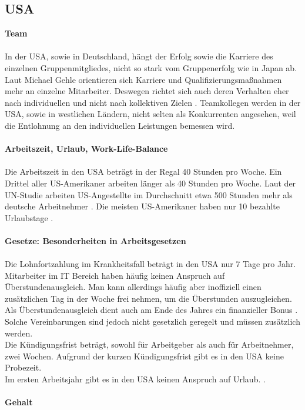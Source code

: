 	\subsection*{USA}
	\textbf{Team}\\
	\\
	In der USA, sowie in Deutschland, hängt der Erfolg sowie die Karriere des einzelnen Gruppenmitgliedes, nicht so stark vom Gruppenerfolg wie in Japan ab. Laut Michael Gehle orientieren sich Karriere und Qualifizierungsmaßnahmen mehr an einzelne Mitarbeiter. Deswegen richtet sich auch deren Verhalten eher nach individuellen und nicht nach kollektiven Zielen \cite[233]{3LaenderVergl}. 
	Teamkollegen werden in der USA, sowie in westlichen Ländern, nicht selten als Konkurrenten angesehen, weil die Entlohnung an den individuellen Leistungen bemessen wird. \\ \\
		\textbf{Arbeitszeit, Urlaub, Work-Life-Balance}\\
		\\
	Die Arbeitszeit in den USA beträgt in der Regal 40 Stunden pro Woche. 
	Ein Drittel aller US-Amerikaner arbeiten länger als 40 Stunden pro Woche.
	Laut der UN-Studie arbeiten US-Angestellte im Durchschnitt etwa 500 Stunden mehr als deutsche Arbeitnehmer \cite{ArbeitsumgUSA}. Die meisten US-Amerikaner haben nur 10 bezahlte Urlaubstage \cite{InfoUSArbVertr}.\\ \\
	\textbf{Gesetze: Besonderheiten in Arbeitsgesetzen}\\
		\\
		Die Lohnfortzahlung im Krankheitsfall beträgt in den USA nur 7 Tage pro Jahr. 
		Mitarbeiter im IT Bereich haben häufig keinen Anspruch auf Überstundenausgleich. Man kann allerdings häufig aber inoffiziell einen zusätzlichen Tag in der Woche frei nehmen, um die Überstunden auszugleichen. Als Überstundenausgleich dient auch am Ende des Jahres ein finanzieller Bonus \cite{InfoUSArbVertr}.
		Solche Vereinbarungen sind jedoch nicht gesetzlich geregelt und müssen zusätzlich werden.\\
		Die Kündigungsfrist beträgt, sowohl für Arbeitgeber als auch für 
		Arbeitnehmer, zwei Wochen. Aufgrund der kurzen Kündigungsfrist gibt es in den USA keine Probezeit.\\
		Im ersten Arbeitsjahr gibt es in den USA keinen Anspruch auf Urlaub. \cite{USA_Tipps}.
		\\ \\
	\textbf{Gehalt}\\

